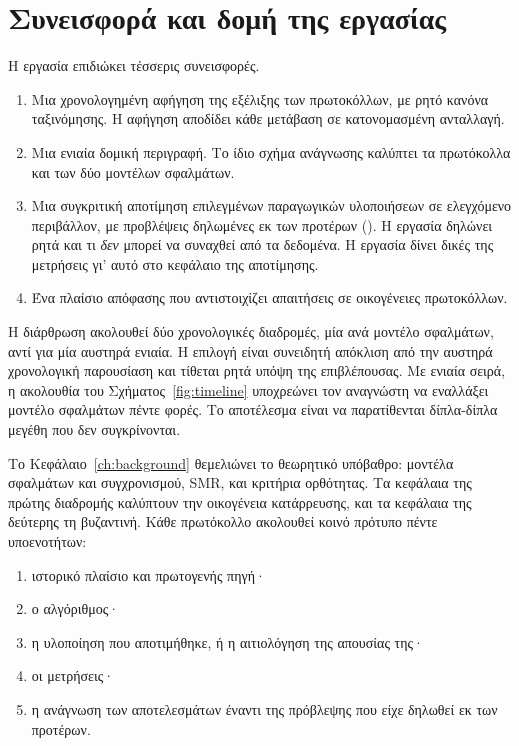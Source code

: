 \section{Συνεισφορά και δομή της εργασίας}
\label{sec:structure}

Η εργασία επιδιώκει τέσσερις συνεισφορές.

\begin{enumerate}[label=\textbf{(\alph*)},leftmargin=2.4em]
  \item Μια χρονολογημένη αφήγηση της εξέλιξης των πρωτοκόλλων, με ρητό
  κανόνα ταξινόμησης. Η αφήγηση αποδίδει κάθε μετάβαση σε κατονομασμένη
  ανταλλαγή.
  \item Μια ενιαία δομική περιγραφή. Το ίδιο σχήμα ανάγνωσης καλύπτει τα
  πρωτόκολλα και των δύο μοντέλων σφαλμάτων.
  \item Μια συγκριτική αποτίμηση επιλεγμένων παραγωγικών υλοποιήσεων σε
  ελεγχόμενο περιβάλλον, με προβλέψεις δηλωμένες εκ των προτέρων
  (). Η εργασία δηλώνει ρητά και τι
  \emph{δεν} μπορεί να συναχθεί από τα δεδομένα. Η εργασία δίνει δικές
  της μετρήσεις γι' αυτό στο κεφάλαιο της αποτίμησης.
  \item Ένα πλαίσιο απόφασης που αντιστοιχίζει απαιτήσεις σε οικογένειες
  πρωτοκόλλων.
\end{enumerate}

Η διάρθρωση ακολουθεί δύο χρονολογικές διαδρομές, μία ανά μοντέλο
σφαλμάτων, αντί για μία αυστηρά ενιαία. Η επιλογή είναι συνειδητή
απόκλιση από την αυστηρά χρονολογική παρουσίαση και τίθεται ρητά υπόψη
της επιβλέπουσας. Με ενιαία σειρά, η ακολουθία του
Σχήματος~\ref{fig:timeline} υποχρεώνει τον αναγνώστη να εναλλάξει μοντέλο
σφαλμάτων πέντε φορές. Το αποτέλεσμα είναι να παρατίθενται δίπλα-δίπλα
μεγέθη που δεν συγκρίνονται.

Το Κεφάλαιο~\ref{ch:background} θεμελιώνει το θεωρητικό υπόβαθρο: μοντέλα
σφαλμάτων και συγχρονισμού, SMR,  και κριτήρια ορθότητας. Τα
κεφάλαια της πρώτης διαδρομής καλύπτουν την οικογένεια κατάρρευσης, και
τα κεφάλαια της δεύτερης τη βυζαντινή. Κάθε πρωτόκολλο ακολουθεί κοινό
πρότυπο πέντε υποενοτήτων:

\begin{enumerate}[label=\arabic*.,leftmargin=2.4em]
  \item ιστορικό πλαίσιο και πρωτογενής πηγή·
  \item ο αλγόριθμος·
  \item η υλοποίηση που αποτιμήθηκε, ή η αιτιολόγηση της απουσίας της·
  \item οι μετρήσεις·
  \item η ανάγνωση των αποτελεσμάτων έναντι της πρόβλεψης που είχε δηλωθεί
  εκ των προτέρων.
\end{enumerate}

